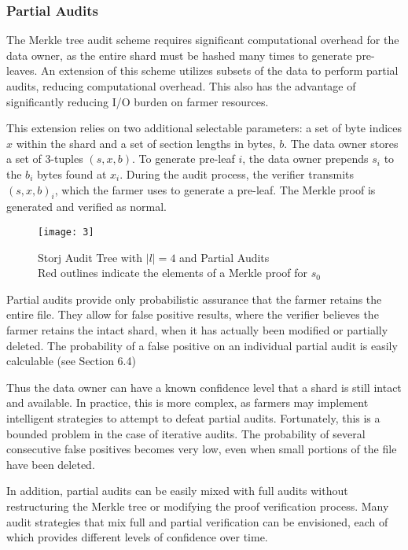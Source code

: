\documentclass[a4paper,10pt]{article}
\begin{document}
\subsubsection{Partial Audits}
The Merkle tree audit scheme requires significant computational overhead for the data owner, as the entire shard must be hashed many times to generate pre-leaves. An extension of this scheme utilizes subsets of the data to perform partial audits, reducing computational overhead. This also has the advantage of significantly reducing I/O burden on farmer resources.

This extension relies on two additional selectable parameters: a set of byte indices $ x $ within the shard and a set of section lengths in bytes, $ b $. The data owner stores a set of 3-tuples $ (s, x, b) $. To generate pre-leaf $ i $, the data owner prepends $ s_{i} $ to the $ b_{i} $ bytes found at $ x_{i} $. During the audit process, the verifier transmits $ (s, x, b)_{i} $, which the farmer uses to generate a pre-leaf. The Merkle proof is generated and verified as normal.

\begin{figure}[hbt]
\centering
\texttt{[image: 3]}
\caption{Storj Audit Tree with $ |l| = 4 $ and Partial Audits\\Red outlines indicate the elements of a Merkle proof for $ s_{0} $}
\end{figure}

Partial audits provide only probabilistic assurance that the farmer retains the entire file. They allow for false positive results, where the verifier believes the farmer retains the intact shard, when it has actually been modified or partially deleted. The probability of a false positive on an individual partial audit is easily calculable (see Section 6.4)

Thus the data owner can have a known confidence level that a shard is still intact and available. In practice, this is more complex, as farmers may implement intelligent strategies to attempt to defeat partial audits. Fortunately, this is a bounded problem in the case of iterative audits. The probability of several consecutive false positives becomes very low, even when small portions of the file have been deleted.

In addition, partial audits can be easily mixed with full audits without restructuring the Merkle tree or modifying the proof verification process. Many audit strategies that mix full and partial verification can be envisioned, each of which provides different levels of confidence over time.
\end{document}
